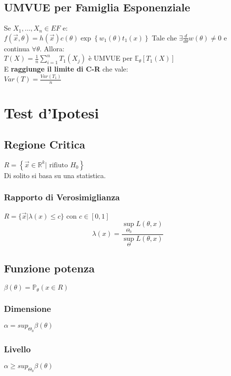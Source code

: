 \documentclass[a4paper,notitlepage]{report}%
\newcommand{\R}{\mathbb{R}}%
\newcommand{\p}{\mathbb{P}} %
\newcommand{\E}{\mathbb{E}} %
\begin{document}
\begin{multicols*}{2}
    \subsection*{UMVUE per Famiglia Esponenziale}
    Se $X_1,\dots,X_n\in EF$ e: \\
    $f(\vec{x},\theta) = h(\vec{x}) c(\theta) \exp\left\{ w_1(\theta) t_1(x) \right\}$
    Tale che 
    $\exists \frac{d}{d\theta} w(\theta) \neq 0$
    e continua $\forall\theta$. Allora:\\
    $T(X) = \frac{1}{n} \sum_{i=1}^n T_1(X_j)$ è UMVUE
    per $\E_\theta[T_1(X)]$\\
    E \textbf{raggiunge il limite di C-R} che vale:\\
    $Var(T)=\frac{Var(T_1)}{n}$


\section*{Test d'Ipotesi}


    \subsection*{Regione Critica}
    $R= \left\{ \vec{x}\in\R^k | \text{ rifiuto } H_0  \right\}$ \\
    Di solito si basa su una statistica.

        \subsubsection*{Rapporto di Verosimiglianza}
        $R = \{ \vec{x} | \lambda(x) \leq c \}$ con $c\in[0,1]$
        \[
            \lambda(x) = \frac{ \sup_{\Theta_0} L(\theta, x) }{ \sup_{\Theta} L(\theta, x) }    
        \]


    \subsection*{Funzione potenza}
    $\beta(\theta) = \p_\theta(x\in R)$

        \subsubsection*{Dimensione}
        $\alpha = sup_{\Theta_0} \beta(\theta)$

        \subsubsection*{Livello}
        $\alpha \geq sup_{\Theta_0} \beta(\theta)$



\end{multicols*}
\end{document}
